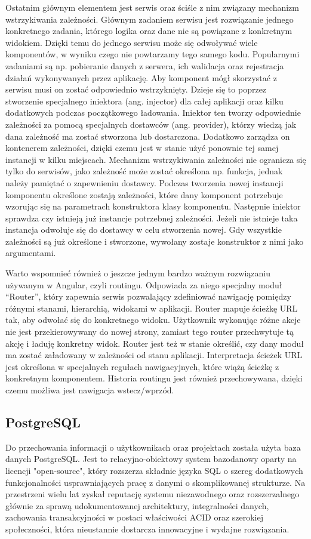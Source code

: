 Ostatnim głównym elementem jest serwis oraz ściśle z nim związany mechanizm wstrzykiwania zależności. Głównym zadaniem serwisu jest rozwiązanie jednego konkretnego zadania, którego logika oraz dane nie są powiązane z konkretnym widokiem. Dzięki temu do jednego serwisu może się odwoływać wiele komponentów, w wyniku czego nie powtarzamy tego samego kodu. Popularnymi zadaniami są np. pobieranie danych z serwera, ich walidacja oraz rejestracja działań wykonywanych przez aplikację. Aby komponent mógł skorzystać z serwisu musi on zostać odpowiednio wstrzyknięty. Dzieje się to poprzez stworzenie specjalnego iniektora (ang. injector) dla całej aplikacji oraz kilku dodatkowych podczas początkowego ładowania. Iniektor ten tworzy odpowiednie zależności za pomocą specjalnych dostawców (ang. provider), którzy wiedzą jak dana zależność ma zostać stworzona lub dostarczona. Dodatkowo zarządza on kontenerem zależności, dzięki czemu jest w stanie użyć ponownie tej samej instancji w kilku miejscach. Mechanizm wstrzykiwania zależności nie ogranicza się tylko do serwisów, jako zależność może zostać określona np. funkcja, jednak należy pamiętać o zapewnieniu dostawcy. Podczas tworzenia nowej instancji komponentu określone zostają zależności, które dany komponent potrzebuje wzorując się na parametrach konstruktora klasy komponentu. Następnie iniektor sprawdza czy istnieją już instancje potrzebnej zależności. Jeżeli nie istnieje taka instancja odwołuje się do dostawcy w celu stworzenia nowej. Gdy wszystkie zależności są już określone i stworzone, wywołany zostaje konstruktor z nimi jako argumentami.


Warto wspomnieć również o jeszcze jednym bardzo ważnym rozwiązaniu używanym w \mbox{Angular}, czyli routingu. Odpowiada za niego specjalny moduł “Router”, który zapewnia serwis pozwalający zdefiniować nawigację pomiędzy różnymi stanami, hierarchią, widokami w aplikacji. Router mapuje ścieżkę URL tak, aby odwołać się do konkretnego widoku. Użytkownik wykonując różne akcje nie jest przekierowywany do nowej strony, zamiast tego router przechwytuje tą akcję i ładuję konkretny widok. Router jest też w stanie określić, czy dany moduł ma zostać załadowany w zależności od stanu aplikacji. Interpretacja ścieżek URL jest określona w specjalnych regułach nawigacyjnych, które wiążą ścieżkę z konkretnym komponentem. Historia routingu jest również przechowywana, dzięki czemu możliwa jest nawigacja wstecz/wprzód.


\subsection{PostgreSQL}
\label{subsec:postgreSQL}
Do przechowania informacji o użytkownikach oraz projektach została użyta baza danych \mbox{PostgreSQL}. Jest to relacyjno-obiektowy system bazodanowy oparty na licencji "open-source", który rozszerza składnie języka SQL o szereg dodatkowych funkcjonalności usprawniających pracę z danymi o skomplikowanej strukturze. Na przestrzeni wielu lat zyskał reputację systemu niezawodnego oraz rozszerzalnego głównie za sprawą udokumentowanej architektury, integralności danych, zachowania transakcyjności w postaci właściwości ACID oraz szerokiej społeczności, która nieustannie dostarcza innowacyjne i wydajne rozwiązania.


